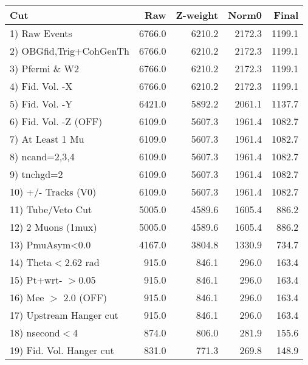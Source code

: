  \begin{table}[h!]\centering
 \begin{tabular}{||l||r|r|r|r||}
 \hline
 \hline
 Cut & Raw & Z-weight & Norm0 & Final \\
 \hline
  1) Raw Events           &      6766.0 &      6210.2 &      2172.3 &      1199.1 \\
  2) OBGfid,Trig+CohGenTh &      6766.0 &      6210.2 &      2172.3 &      1199.1 \\
  3) Pfermi \& W2         &      6766.0 &      6210.2 &      2172.3 &      1199.1 \\
  4) Fid. Vol. -X         &      6766.0 &      6210.2 &      2172.3 &      1199.1 \\
  5) Fid. Vol. -Y         &      6421.0 &      5892.2 &      2061.1 &      1137.7 \\
  6) Fid. Vol. -Z (OFF)   &      6109.0 &      5607.3 &      1961.4 &      1082.7 \\
  7) At Least 1 Mu        &      6109.0 &      5607.3 &      1961.4 &      1082.7 \\
  8) ncand=2,3,4          &      6109.0 &      5607.3 &      1961.4 &      1082.7 \\
  9) tnchgd=2             &      6109.0 &      5607.3 &      1961.4 &      1082.7 \\
 10) +/- Tracks (V0)      &      6109.0 &      5607.3 &      1961.4 &      1082.7 \\
 11) Tube/Veto Cut        &      5005.0 &      4589.6 &      1605.4 &       886.2 \\
 12) 2 Muons (1mux)       &      5005.0 &      4589.6 &      1605.4 &       886.2 \\
 13) PmuAsym<0.0          &      4167.0 &      3804.8 &      1330.9 &       734.7 \\
 14) Theta$<$2.62 rad     &       915.0 &       846.1 &       296.0 &       163.4 \\
 15) Pt+wrt- $>$0.05      &       915.0 &       846.1 &       296.0 &       163.4 \\
 16) Mee $>$ 2.0  (OFF)   &       915.0 &       846.1 &       296.0 &       163.4 \\
 17) Upstream Hanger cut  &       915.0 &       846.1 &       296.0 &       163.4 \\
 18) nsecond$<$4          &       874.0 &       806.0 &       281.9 &       155.6 \\
 19) Fid. Vol. Hanger cut &       831.0 &       771.3 &       269.8 &       148.9 \\

\end{tabular}
\end{table}
